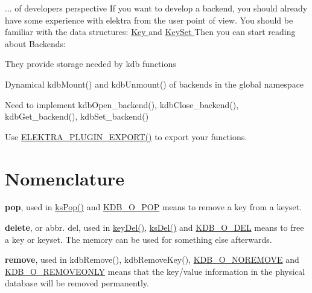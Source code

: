\begin{DoxyItemize}
\item ... of developers perspective If you want to develop a backend, you should already have some experience with elektra from the user point of view. You should be familiar with the data structures: \hyperlink{group__key}{Key } and \hyperlink{group__keyset}{KeySet } Then you can start reading about Backends:
\begin{DoxyItemize}
\item They provide storage needed by kdb functions
\item Dynamical kdbMount() and kdbUnmount() of backends in the global namespace
\item Need to implement kdbOpen\_\-backend(), kdbClose\_\-backend(), kdbGet\_\-backend(), kdbSet\_\-backend()
\item Use \hyperlink{group__plugin_gabe78724d2d477eef39997fd9b85bff16}{ELEKTRA\_\-PLUGIN\_\-EXPORT()} to export your functions.
\end{DoxyItemize}
\end{DoxyItemize}\hypertarget{index_nomenclature}{}\section{Nomenclature}\label{index_nomenclature}

\begin{DoxyItemize}
\item {\bfseries pop}, used in \hyperlink{group__keyset_gae42530b04defb772059de0600159cf69}{ksPop()} and \hyperlink{group__keyset_KDB_O_POP}{KDB\_\-O\_\-POP} means to remove a key from a keyset.
\item {\bfseries delete}, or abbr. del, used in \hyperlink{group__key_ga3df95bbc2494e3e6703ece5639be5bb1}{keyDel()}, \hyperlink{group__keyset_ga27e5c16473b02a422238c8d970db7ac8}{ksDel()} and \hyperlink{group__kdb_gga98a3d6a4016c9dad9cbd1a99a9c2a45aa66a5380c120f25f28f49848c4a863ead}{KDB\_\-O\_\-DEL} means to free a key or keyset. The memory can be used for something else afterwards.
\item {\bfseries remove}, used in kdbRemove(), kdbRemoveKey(), \hyperlink{group__kdb_gga98a3d6a4016c9dad9cbd1a99a9c2a45aa7649f575c2eb0adeaf2c9173ae16e0e6}{KDB\_\-O\_\-NOREMOVE} and \hyperlink{group__kdb_gga98a3d6a4016c9dad9cbd1a99a9c2a45aaf6ed09cee8aa8cf0d6a0e318a7105440}{KDB\_\-O\_\-REMOVEONLY} means that the key/value information in the physical database will be removed permanently. 
\end{DoxyItemize}